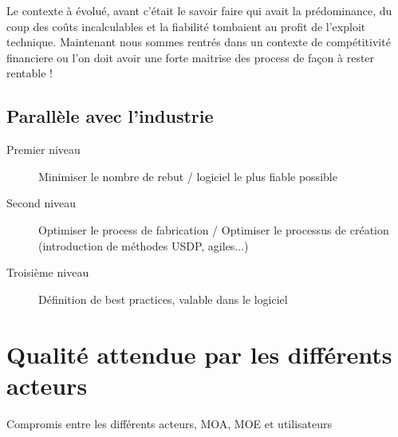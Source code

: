 Le contexte à évolué, avant c’était le savoir faire qui avait la prédominance, du coup des coûts incalculables et la fiabilité tombaient au profit de l’exploit technique. Maintenant nous sommes rentrés dans un contexte de compétitivité financiere ou l'on doit avoir une forte maitrise des process de façon à rester rentable !

	\subsection{Parallèle avec l’industrie}
	
	\begin{description}
	\item[Premier niveau] Minimiser le nombre de rebut  / logiciel le plus fiable possible
	\item[Second niveau] Optimiser le process de fabrication  / Optimiser le processus de création (introduction de méthodes USDP, agiles...)
	\item[Troisième niveau]Définition de best practices, valable dans le logiciel
	\end{description}


\section{Qualité attendue par les différents acteurs}

Compromis entre les différents acteurs, MOA, MOE et utilisateurs

